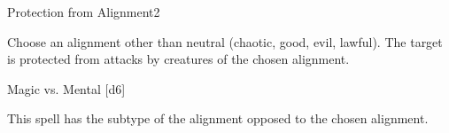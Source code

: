 \begin{spellsection}{Protection from Alignment}{2}
    \begin{spellheader}
    \end{spellheader}
    \begin{spellcontent}
        \begin{spelltargetinginfo}
        \end{spelltargetinginfo}
        \begin{spelleffects}
            \spellspecial Choose an alignment other than neutral (chaotic, good, evil, lawful).
            \spelleffect The target is protected from attacks by creatures of the chosen alignment.
            \spelldur \durshort \dismissable
        \end{spelleffects}
    \end{spellcontent}
    \begin{spellsubcontent}
        \begin{spelltargetinginfo}
        \end{spelltargetinginfo}
        \begin{spelleffects}
            \begin{spellattack}{Magic vs. Mental}
                \spellsuccess {}[d6]
            \end{spellattack}
        \end{spelleffects}
    \end{spellsubcontent}
    \begin{spellfooter}
        \spellnotes This spell has the subtype of the alignment opposed to the chosen alignment.
        \miscastrandom
    \end{spellfooter}
\end{spellsection}


